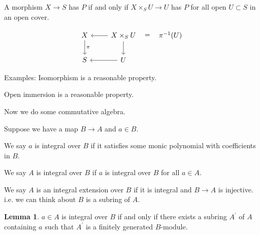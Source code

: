 \documentclass{article}
\theoremstyle{definition}
\newtheorem{lemma}[theorem]{Lemma}
\begin{document}
    A morphism \(X \to S\) has \(P\) if and only if \(X \times_S U \to U\) has \(P\) for all open \(U \subset S\) in an open cover.

    \[
        \begin{tikzcd}
            X \ar[d,"\pi"] & X \times_S U \ar[l] \ar[r,"=",phantom] \ar[d] & \pi ^{-1} (U) \\ S & U \ar[l]
        \end{tikzcd}
    \]

    Examples: Isomorphism is a reasonable property.

    Open immersion is a reasonable property.

    Now we do some commutative algebra.

    Suppose we have a map \(B \to A\) and \(a\in B\).

    We say \(a\) is integral over \(B\) if it satisfies some monic polynomial with coefficients in \(B\).

    We say \(A\) is integral over \(B\) if \(a\) is integral over \(B\) for all \(a\in A\).

    We say \(A\) is an integral extension over \(B\) if it is integral and \(B \to A\) is injective. i.e. we can think about \(B\) is a subring of \(A\).

    \begin{lemma}
        \(a\in A\) is integral over \(B\) if and only if there exists a subring \(A^{\prime}\) of \(A\) containing \(a\) such that \(A^{\prime}\) is a finitely generated \(B\)-module.
    \end{lemma}
\end{document}
